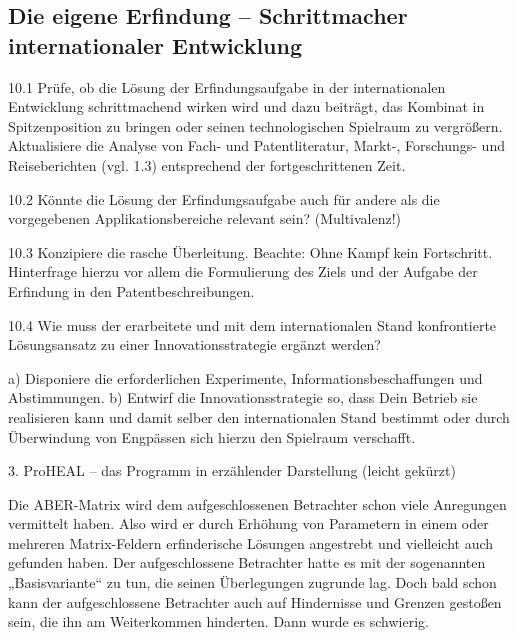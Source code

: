 \documentclass[12pt,a4paper]{article}
\begin{document}
\subsection{Die eigene Erfindung – Schrittmacher internationaler Entwicklung}

10.1 Prüfe, ob die Lösung der Erfindungsaufgabe in der internationalen
Entwicklung schrittmachend wirken wird und dazu beiträgt, das Kombinat in
Spitzenposition zu bringen oder seinen technologischen Spielraum zu
vergrößern. Aktualisiere die Analyse von Fach- und Patentliteratur, Markt-,
Forschungs- und Reiseberichten (vgl. 1.3) entsprechend der fortgeschrittenen
Zeit.


10.2  Könnte die Lösung der Erfindungsaufgabe auch für andere als die vorgegebenen Applikationsbereiche relevant sein? (Multivalenz!)


10.3  Konzipiere die rasche Überleitung. Beachte: Ohne Kampf kein Fortschritt. Hinterfrage hierzu vor allem die Formulierung des Ziels und der Aufgabe der Erfindung in den Patentbeschreibungen.


10.4  Wie muss der erarbeitete und mit dem internationalen Stand konfrontierte Lösungsansatz zu einer Innovationsstrategie ergänzt werden?

    a) Disponiere die erforderlichen Experimente, Informationsbeschaffungen und Abstimmungen.
    b) Entwirf die Innovationsstrategie so, dass Dein Betrieb sie realisieren kann und damit selber den internationalen Stand bestimmt oder durch Überwindung von Engpässen sich hierzu den Spielraum verschafft.







3. ProHEAL – das Programm in erzählender Darstellung (leicht gekürzt)

Die ABER-Matrix wird dem aufgeschlossenen Betrachter schon viele Anregungen vermittelt haben. Also wird er durch Erhöhung von Parametern in einem oder mehreren Matrix-Feldern erfinderische Lösungen angestrebt und vielleicht auch gefunden haben. Der aufgeschlossene Betrachter hatte es mit der sogenannten „Basisvariante“ zu tun, die seinen Überlegungen zugrunde lag. Doch bald schon kann der aufgeschlossene Betrachter auch auf Hindernisse und Grenzen gestoßen sein, die ihn am Weiterkommen hinderten. Dann wurde es schwierig.
\end{document}
